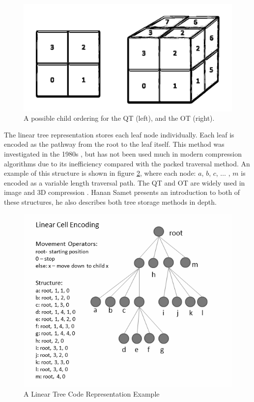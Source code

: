 \begin{figure}[!h]
\centering
\includegraphics[width=12cm]{images/ch2/ChildOrderExample}
\caption{A possible child ordering for the QT (left), and the OT (right).}
\label{ChildOrderExample}
\end{figure}

The linear tree representation stores each leaf node individually. Each leaf is encoded as the pathway from the root to the leaf itself. This method was investigated in the 1980s \cite{Gargantini82Effective,Yufei88Octcodes}, but has not been used much in modern compression algorithms due to its inefficiency compared with the packed traversal method. An example of this structure is shown in figure \ref{LinearCellCodeRepresentation}, where each node: $a$, $b$, $c$, $\dots$ , $m$  is encoded as a variable length traversal path. The QT and OT are widely used in image \cite{Varma12Application} and 3D compression \cite{Schnabel06Octree}. Hanan Samet \cite{Samet88Fund1} presents an introduction to both of these structures, he also describes both tree storage methods in depth. 

\begin{figure}[!h]
\centering
\includegraphics[width=12cm]{images/ch2/LinearCellCodeRepresentation}
\caption{A Linear Tree Code Representation Example}
\label{LinearCellCodeRepresentation}
\end{figure}


